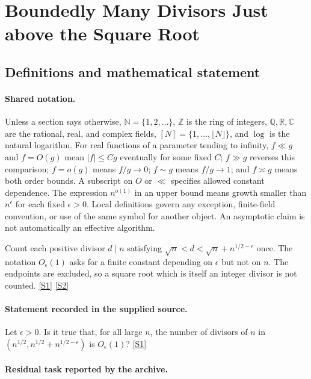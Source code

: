 \documentclass[11pt,a4paper]{article}
\newcommand{\N}{\mathbb{N}}
\newcommand{\Z}{\mathbb{Z}}
\newcommand{\Q}{\mathbb{Q}}
\newcommand{\R}{\mathbb{R}}
\newcommand{\C}{\mathbb{C}}
\newcommand{\sref}[2]{\hyperlink{source:#1:#2}{[S#2]}}
\begin{document}
\section{Boundedly Many Divisors Just above the Square Root}\label{statement}


\subsection{Definitions and mathematical statement}

\paragraph{Shared notation.}Unless a section says otherwise, $\N=\{1,2,\ldots\}$,
$\Z$ is the ring of integers, $\Q,\R,\C$ are the rational, real, and complex
fields, $[N]=\{1,\ldots,\lfloor N\rfloor\}$, and $\log$ is the natural
logarithm. For real functions of a parameter tending to infinity,
$f\ll g$ and $f=O(g)$ mean $|f|\leq Cg$ eventually for some fixed $C$;
$f\gg g$ reverses this comparison; $f=o(g)$ means $f/g\to0$;
$f\sim g$ means $f/g\to1$; and $f\asymp g$ means both order bounds.
A subscript on $O$ or $\ll$ specifies allowed constant dependence.
The expression $n^{o(1)}$ in an upper bound means growth smaller than
$n^\epsilon$ for each fixed $\epsilon>0$. Local definitions govern any
exception, finite-field convention, or use of the same symbol for another
object. An asymptotic claim is not automatically an effective algorithm.



Count each positive divisor $d\mid n$ satisfying $\sqrt n<d<\sqrt n+n^{1/2-\epsilon}$ once. The notation $O_\epsilon(1)$ asks for a finite constant depending on $\epsilon$ but not on $n$. The endpoints are excluded, so a square root which is itself an integer divisor is not counted. \sref{statement}{1} \sref{statement}{2}

\paragraph{Statement recorded in the supplied source.}
Let $\epsilon>0$. Is it true that, for all large $n$, the number of divisors of $n$ in $(n^{1/2},n^{1/2}+n^{1/2-\epsilon})$ is $O_\epsilon(1)$? \sref{statement}{1}

\paragraph{Residual task reported by the archive.}
\end{document}
